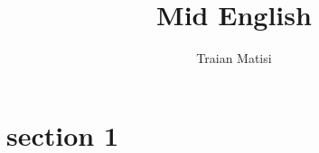 \documentclass[12pt,a4paper]{article} %
\title{Mid English}
\author{Traian Matisi}
\begin{document}
	\maketitle
	\section{section 1}
\end{document}
